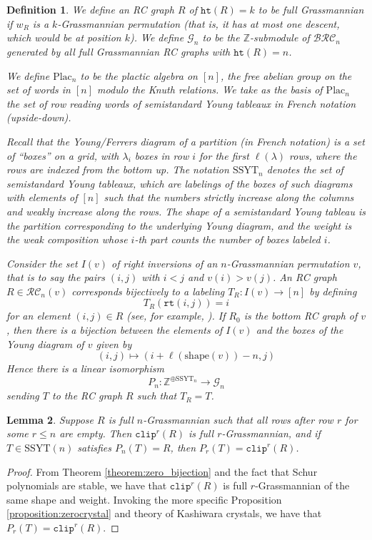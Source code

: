 \documentclass[pdflatex,sn-mathphys-num]{sn-jnl}
\numberwithin{equation}{subsection}
\newcommand{\wof}[1]{w_{#1}}
\newcommand{\grass}{\mathcal{G}}
\newcommand{\plac}{\mathrm{Plac}}
\newcommand{\rtt}{\mathtt{rt}}
\newcommand{\hr}{\mathtt{ht}}
\newcommand{\clp}{\mathtt{clip}}
\newcommand{\BRC}{\mathcal{BRC}}
\newcommand{\RC}{\mathcal{RC}}
\newcommand{\SSYT}{\mathrm{SSYT}}
\theoremstyle{thmstyleone}
\newtheorem{lemma}{Lemma}[subsection]
\theoremstyle{thmstylethree}
\newtheorem{definition}[lemma]{Definition}
\theoremstyle{thmstyletwo}
\begin{document}
\begin{definition}
We define an RC graph $R$ of $\hr(R)=k$ to be \emph{full Grassmannian} if $\wof{R}$ is a $k$-Grassmannian permutation (that is, it has at most one descent, which would be at position $k$). We define $\grass_n$ to be the $\mathbb{Z}$-submodule of $\BRC_n$ generated by all full Grassmannian RC graphs with $\hr(R)= n$.

We define $\plac_n$ to be the plactic algebra on $[n]$, the free abelian group on the set of words in $[n]$ modulo the Knuth relations. We take as the basis of $\plac_n$ the set of row reading words of semistandard Young tableaux \emph{in French notation} (upside-down).

Recall that the Young/Ferrers diagram of a partition (in French notation) is a set of ``boxes'' on a grid, with $\lambda_i$ boxes in row $i$ for the first $\ell(\lambda)$ rows, where the rows are indexed from the bottom up. The notation $\mathrm{SSYT}_n$ denotes the set of semistandard Young tableaux, which are labelings of the boxes of such diagrams with elements of $[n]$ such that the numbers strictly increase along the columns and weakly increase along the rows. The shape of a semistandard Young tableau is the partition corresponding to the underlying Young diagram, and the weight is the weak composition whose $i$-th part counts the number of boxes labeled $i$.

Consider the set $I(v)$ of right inversions of an $n$-Grassmannian permutation $v$, that is to say the pairs $(i,j)$ with $i<j$ and $v(i)>v(j)$. An RC graph $R\in\RC_n(v)$ corresponds bijectively to a labeling $T_R:I(v)\to [n]$ by defining
$$T_R(\rtt(i,j)) = i$$
for an element $(i,j)\in R$ (see, for example, \cite{axelrodfreed2025inversionstableaux}). If $R_0$ is the bottom RC graph of $v$, then there is a bijection between the elements of $I(v)$ and the boxes of the Young diagram of $v$ given by
$$(i,j) \mapsto (i + \ell(\mathrm{shape}(v)) - n, j)$$
Hence there is a linear isomorphism
$$P_n:\mathbb{Z}^{\oplus\mathrm{SSYT}_n}\to \grass_n$$
sending $T$ to the RC graph $R$ such that $T_R = T$.
\end{definition}

\begin{lemma}
Suppose $R$ is full $n$-Grassmannian such that all rows after row $r$ for some $r\leq n$ are empty. Then $\clp^r(R)$ is full $r$-Grassmannian, and if $T\in \SSYT(n)$ satisfies $P_n(T)=R$, then $P_r(T)=\clp^r(R)$.
\end{lemma}
\begin{proof}
From Theorem \ref{theorem:zero_bijection} and the fact that Schur polynomials are stable, we have that $\clp^r(R)$ is full $r$-Grassmannian of the same shape and weight. Invoking the more specific Proposition \ref{proposition:zerocrystal} and theory of Kashiwara crystals, we have that $P_r(T)=\clp^r(R)$.
\end{proof}
\end{document}
